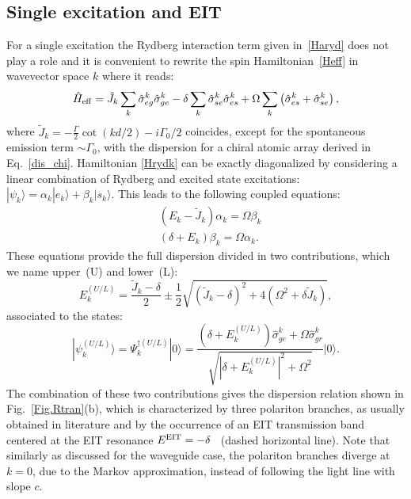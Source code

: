 \documentclass[pra,twocolumn,showpacs,preprintnumbers,amsmath,amssymb]{revtex4-1}
\begin{document}
\subsection{Single excitation and EIT}
For a single excitation the Rydberg interaction term given in~\eqref{Haryd} does not play a role and it is convenient to rewrite the spin Hamiltonian~\eqref{Heff} 
in wavevector space $k$ where it reads:
\begin{equation}\label{Hrydk}
\hat H_{\rm eff}=\tilde J_k\sum_k\hat\sigma_{eg}^k\hat\sigma_{ge}^k -\delta\sum_k \hat\sigma^k_{se}\hat\sigma^k_{es}+\Omega\sum_k\left(\hat\sigma_{es}^k+\hat\sigma_{se}^k\right),
\end{equation}
where $\tilde J_k=-\frac{\Gamma}{2}\cot{(kd/2)}-i\Gamma_0/2$ coincides, except for the spontaneous emission term $\sim \Gamma_0$, with the dispersion for a chiral atomic array derived in Eq.~\eqref{dis_chi}. 
Hamiltonian \eqref{Hrydk} can be exactly diagonalized  by considering a linear combination of Rydberg and excited state excitations: $|\psi_k\rangle= \alpha_k|e_k\rangle+\beta_k|s_k\rangle$. This leads to the following coupled equations:
\begin{equation}
\begin{split}
&\left(E_k-\tilde J_k\right)\alpha_k=\Omega \beta_k\\
&\left( \delta+E_k\right)\beta_k=\Omega \alpha_k.
\end{split}
\end{equation}
These equations provide the  full dispersion divided in two contributions, which  we name upper~(U) and lower~(L):
\begin{equation}\label{disEITex}
E^{(U/L)}_k=\frac{\tilde J_k-\delta}{2}\pm\frac{1}{2}\sqrt{(\tilde J_k-\delta)^2+4(\Omega^2+\delta\tilde J_k)},
\end{equation}
associated to the  states: 
\begin{equation}\label{polariton}
|\psi^{(U/L)}_k\rangle=\Psi^{\dagger(U/L)}_k|0\rangle=\frac{(\delta+E^{(U/L)}_k)\hat \sigma^k_{ge} +\Omega \hat \sigma^k_{gr}}{\sqrt{|\delta+E^{(U/L)}_k|^2+\Omega^2}}|0\rangle.
\end{equation}
The combination of these two contributions  gives the dispersion relation  shown in Fig.~\ref{Fig.Rtran}(b), which  is characterized by three polariton branches, as usually obtained in literature \cite{lukinEIT,bienas} and by the occurrence of an EIT transmission band  centered at the EIT resonance $E^{\rm EIT}=-\delta$~ (dashed horizontal line). Note that similarly as discussed for the waveguide case, the polariton branches diverge at $k=0$, due to the Markov approximation, instead of following the light line with slope $c$. 
\end{document}
